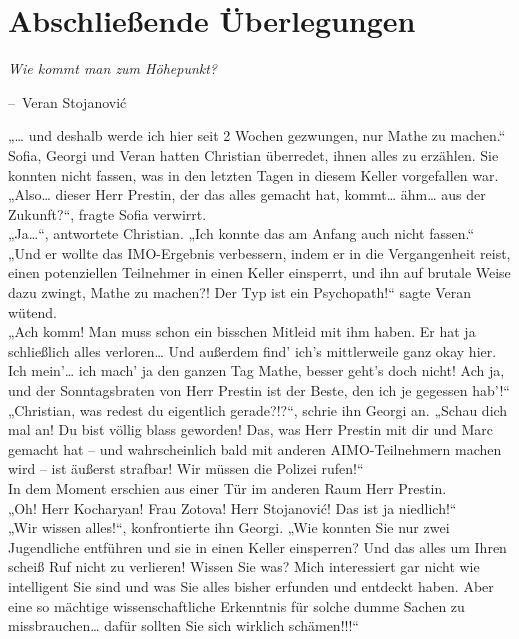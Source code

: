 \documentclass[oneside]{memoir}
\makeatletter
\newenvironment{chapquote}[2][2em]
  {\setlength{\@tempdima}{#1}%
   \def\chapquote@author{#2}%
   \parshape 1 \@tempdima \dimexpr\textwidth-2\@tempdima\relax%
   \itshape}
  {\par\normalfont\hfill--\ \chapquote@author\hspace*{\@tempdima}\par\bigskip}
\makeatother
\begin{document}
\chapter{Abschließende Überlegungen} %
\begin{chapquote}{Veran Stojanović}
\glqq Wie kommt man zum Höhepunkt?\grqq
\end{chapquote}

\noindent „\ldots{} und deshalb werde ich hier seit 2 Wochen gezwungen, nur Mathe zu machen.“ \\
Sofia, Georgi und Veran hatten Christian überredet, ihnen alles zu erzählen. Sie konnten nicht fassen, was in den letzten Tagen in diesem Keller vorgefallen war. \\
„Also\ldots{} dieser Herr Prestin, der das alles gemacht hat, kommt\ldots{} ähm\ldots{} aus der Zukunft?“, fragte Sofia verwirrt. \\
„Ja\ldots“, antwortete Christian. „Ich konnte das am Anfang auch nicht fassen.“ \\
„Und er wollte das IMO-Ergebnis verbessern, indem er in die Vergangenheit reist, einen potenziellen Teilnehmer in einen Keller einsperrt, und ihn auf brutale Weise dazu zwingt, Mathe zu machen?! Der Typ ist ein Psychopath!“ sagte Veran wütend. \\
„Ach komm! Man muss schon ein bisschen Mitleid mit ihm haben. Er hat ja schließlich alles verloren\ldots{} Und außerdem find' ich's mittlerweile ganz okay hier. Ich mein'\ldots{} ich mach' ja den ganzen Tag Mathe, besser geht’s doch nicht!
Ach ja, und der Sonntagsbraten von Herr Prestin ist der Beste, den ich je gegessen hab'!“ \\
„Christian, was redest du eigentlich gerade?!?“, schrie ihn Georgi an. „Schau dich mal an! Du bist völlig blass geworden! Das, was Herr Prestin mit dir und Marc gemacht hat -- und wahrscheinlich bald mit anderen AIMO-Teilnehmern machen wird -- ist äußerst strafbar! Wir müssen die Polizei rufen!“ \\
In dem Moment erschien aus einer Tür im anderen Raum Herr Prestin. \\
„Oh! Herr Kocharyan! Frau Zotova! Herr Stojanović! Das ist ja niedlich!“ \\
„Wir wissen alles!“, konfrontierte ihn Georgi. „Wie konnten Sie nur zwei Jugendliche entführen und sie in einen Keller einsperren? Und das alles um Ihren scheiß Ruf nicht zu verlieren! Wissen Sie was? Mich interessiert gar nicht wie intelligent Sie sind und was Sie alles bisher erfunden und entdeckt haben. Aber eine so mächtige wissenschaftliche Erkenntnis für solche dumme Sachen zu missbrauchen\ldots{} dafür sollten Sie sich wirklich schämen!!!“ \\
\end{document}
